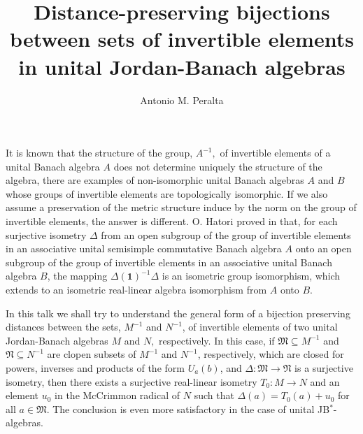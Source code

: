 \documentclass[a4paper]{amsart}
\date{}
\begin{document}
\title{Distance-preserving bijections between sets of invertible elements in unital Jordan-Banach algebras}
\author[A.M. Peralta]{Antonio M. Peralta} %
\address{Instituto de Matemáticas de la Universidad de Granada (IMAG). Departamento de An{\'a}lisis Matem{\'a}tico, Facultad de	Ciencias, Universidad de Granada, 18071 Granada, Spain.}

\maketitle


It is known that the structure of the group, $A^{-1},$ of invertible elements of a unital Banach algebra $A$ does not determine uniquely the structure of the algebra, there are examples of non-isomorphic unital Banach 
algebras $A$ and $B$ whose groups of invertible elements are topologically isomorphic. If we also assume a preservation of the metric structure induce by the norm on the group of invertible elements, the answer is different. O. Hatori proved in \cite{Hat09} that, for each surjective isometry $\Delta$ from an open subgroup of the group of invertible elements in an associative unital semisimple commutative Banach algebra $A$ onto an open subgroup of the group of invertible elements in an associative unital Banach algebra $B$, the mapping $\Delta(\textbf{1})^{-1} \Delta$ is an isometric group isomorphism, which extends to an isometric real-linear algebra isomorphism from $A$ onto $B$.\smallskip

In this talk we shall try to understand the general form of a bijection preserving distances between the sets,  $M^{-1}$ and $N^{-1}$, of invertible elements of two unital Jordan-Banach algebras $M$ and $N,$ respectively. In this case, if  $\mathfrak{M}\subseteq M^{-1}$ and $\mathfrak{N}\subseteq N^{-1}$ are clopen subsets of $M^{-1}$ and $N^{-1}$, respectively, which are closed for powers, inverses and products of the form $U_{a} (b)$, and $\Delta : \mathfrak{M}\to \mathfrak{N}$ is a surjective isometry, then there exists a surjective real-linear isometry $T_0: M\to N$ and an element $u_0$ in the McCrimmon radical of $N$ such that $\Delta (a) = T_0(a) +u_0$ for all $a\in \mathfrak{M}$. The conclusion is even more satisfactory in the case of unital JB$^*$-algebras.\smallskip
\end{document}

